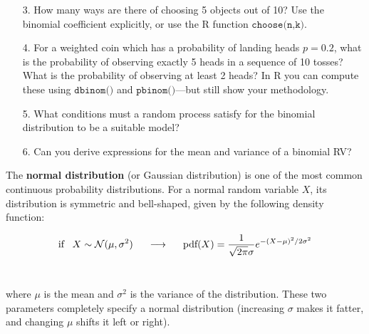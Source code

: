 \documentclass[10pt]{extarticle}
\begin{document}
\hfill 

\begin{itemize}

	\item[3.] How many ways are there of choosing 5 objects out of 10? Use the binomial coefficient explicitly, or use the R function $\texttt{choose(n,k)}$. \\

	\item[4.] For a weighted coin which has a probability of landing heads $p = 0.2$, what is the probability of observing exactly 5 heads in a sequence of 10 tosses? What is the probability of observing at least 2 heads? In R you can compute these using $\texttt{dbinom()}$ and $\texttt{pbinom()}$---but still show your methodology. \\ 

	\item[5.] What conditions must a random process satisfy for the binomial distribution to be a suitable model? \\ 

	\item[6.] Can you derive expressions for the mean and variance of a binomial RV?  

\end{itemize} 

\hfill 

The {\bf normal distribution} (or Gaussian distribution) is one of the most common continuous probability distributions. For a normal random variable $X$, its distribution is symmetric and bell-shaped, given by the following density function: 

$$\text{if} \;\;\; X \sim \mathcal N(\mu,\sigma^2) \hspace{0.5cm} \longrightarrow \hspace{0.5cm} \text{pdf}(X) = \frac{1}{\sqrt{2\pi} \sigma} e^{-(X - \mu)^2/2\sigma^2}$$ \ 

where $\mu$ is the mean and $\sigma^2$ is the variance of the distribution. These two parameters completely specify a normal distribution (increasing $\sigma$ makes it fatter, and changing $\mu$ shifts it left or right).  

\hfill 
\end{document}
